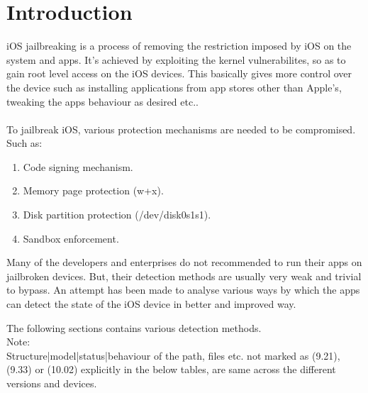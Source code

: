 
\pagestyle{fancy}
\fancyhf{}
\renewcommand{\headrulewidth}{1pt}
\renewcommand{\footrulewidth}{1pt}
\cfoot{\thepage}


\newpage
\section{Introduction}
\vspace{20px}

iOS jailbreaking is a process of removing the restriction imposed by iOS on the system and apps. 
It's achieved by exploiting the kernel vulnerabilites, so as to gain root level access on the iOS devices. 
This basically gives more control over the device such as installing applications from app stores other than Apple's, tweaking the apps behaviour as desired etc..\\\\
To jailbreak iOS, various protection mechanisms are needed to be compromised. Such as:
\begin{enumerate}
	\item Code signing mechanism.
	\item Memory page protection (w+x).
	\item Disk partition protection (/dev/disk0s1s1).
	\item Sandbox enforcement.
\end{enumerate}
Many of the developers and enterprises do not recommended to run their apps on jailbroken devices. But, their detection methods are usually very weak and trivial to bypass. 
An attempt has been made to analyse various ways by which the apps can detect the state of the iOS device in better and improved way.

The following sections contains various detection methods.\\
Note:\\
Structure|model|status|behaviour of the path, files etc. not marked as (9.21), (9.33) or (10.02) explicitly in the below tables, are same across the different versions and devices. 

\newpage
